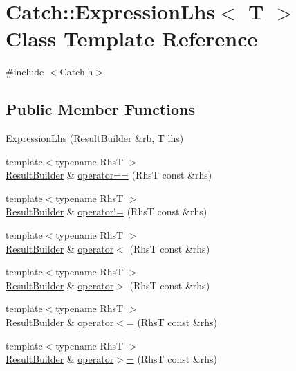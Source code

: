 \hypertarget{class_catch_1_1_expression_lhs}{}\section{Catch\+:\+:Expression\+Lhs$<$ T $>$ Class Template Reference}
\label{class_catch_1_1_expression_lhs}


{\ttfamily \#include $<$Catch.\+h$>$}

\subsection*{Public Member Functions}
\begin{DoxyCompactItemize}
\item 
\hyperlink{class_catch_1_1_expression_lhs_aa829588def6146a94fb75de9c4cc482a}{Expression\+Lhs} (\hyperlink{class_catch_1_1_result_builder}{Result\+Builder} \&rb, T lhs)
\item 
{\footnotesize template$<$typename RhsT $>$ }\\\hyperlink{class_catch_1_1_result_builder}{Result\+Builder} \& \hyperlink{class_catch_1_1_expression_lhs_a2f7ad442c3e5e5764eee736345c40301}{operator==} (RhsT const \&rhs)
\item 
{\footnotesize template$<$typename RhsT $>$ }\\\hyperlink{class_catch_1_1_result_builder}{Result\+Builder} \& \hyperlink{class_catch_1_1_expression_lhs_a44df9974cf20fcfda4e5b6b3c01d5f93}{operator!=} (RhsT const \&rhs)
\item 
{\footnotesize template$<$typename RhsT $>$ }\\\hyperlink{class_catch_1_1_result_builder}{Result\+Builder} \& \hyperlink{class_catch_1_1_expression_lhs_a48428d358ddc89729e2e3407f4024dac}{operator$<$} (RhsT const \&rhs)
\item 
{\footnotesize template$<$typename RhsT $>$ }\\\hyperlink{class_catch_1_1_result_builder}{Result\+Builder} \& \hyperlink{class_catch_1_1_expression_lhs_ad3602a7ad945c751004065b1007dc183}{operator$>$} (RhsT const \&rhs)
\item 
{\footnotesize template$<$typename RhsT $>$ }\\\hyperlink{class_catch_1_1_result_builder}{Result\+Builder} \& \hyperlink{class_catch_1_1_expression_lhs_afd188990e8a14b49c308ce7a79056846}{operator$<$=} (RhsT const \&rhs)
\item 
{\footnotesize template$<$typename RhsT $>$ }\\\hyperlink{class_catch_1_1_result_builder}{Result\+Builder} \& \hyperlink{class_catch_1_1_expression_lhs_a21d30d6026ff2b1f86ddbd6b0a90d036}{operator$>$=} (RhsT const \&rhs)

\end{DoxyCompactItemize}
